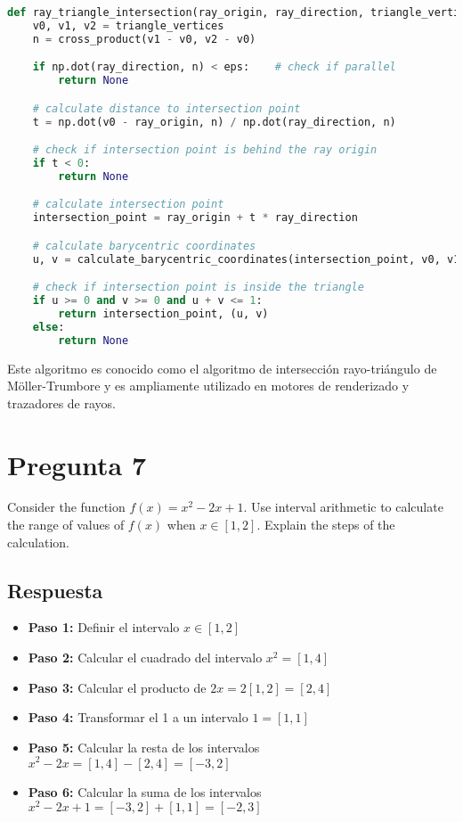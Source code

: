\documentclass{article}
\begin{document}
\begin{lstlisting}[language=Python]
def ray_triangle_intersection(ray_origin, ray_direction, triangle_vertices):
    v0, v1, v2 = triangle_vertices
    n = cross_product(v1 - v0, v2 - v0)

    if np.dot(ray_direction, n) < eps:    # check if parallel
        return None

    # calculate distance to intersection point
    t = np.dot(v0 - ray_origin, n) / np.dot(ray_direction, n)

    # check if intersection point is behind the ray origin
    if t < 0:
        return None

    # calculate intersection point
    intersection_point = ray_origin + t * ray_direction

    # calculate barycentric coordinates
    u, v = calculate_barycentric_coordinates(intersection_point, v0, v1, v2)

    # check if intersection point is inside the triangle
    if u >= 0 and v >= 0 and u + v <= 1:
        return intersection_point, (u, v)
    else:
        return None
\end{lstlisting}

Este algoritmo es conocido como el algoritmo de intersección rayo-triángulo de Möller-Trumbore y es ampliamente utilizado en motores de renderizado y trazadores de rayos.

\section{Pregunta 7}

Consider the function $f(x) = x^2 - 2x + 1$. Use interval arithmetic to calculate the range of values of $f(x)$ when $x \in [1, 2]$. Explain the steps of the calculation.

\subsection{Respuesta}

\begin{itemize}
    \item \textbf{Paso 1:} Definir el intervalo $x \in [1, 2]$
    \item \textbf{Paso 2:} Calcular el cuadrado del intervalo $x^2 = [1, 4]$
    \item \textbf{Paso 3:} Calcular el producto de $2x = 2[1, 2] = [2, 4]$
    \item \textbf{Paso 4:} Transformar el 1 a un intervalo $1 = [1, 1]$
    \item \textbf{Paso 5:} Calcular la resta de los intervalos $x^2 - 2x = [1, 4] - [2, 4] = [-3, 2]$
    \item \textbf{Paso 6:} Calcular la suma de los intervalos $x^2 - 2x + 1 = [-3, 2] + [1, 1] = [-2, 3]$
\end{itemize}
\end{document}
